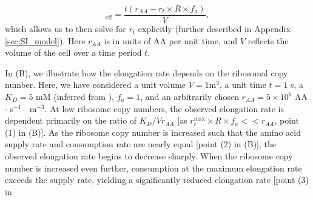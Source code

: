 \begin{equation}
   [AA]_\text{eff} = \frac{t(r_{AA} - r_t \times R \times f_a)}{V},
   \label{eq:aa_final}
\end{equation}
which allows us to then solve for $r_t$ explicitly (further described in
Appendix \ref{sec:SI_model}). Here $r_{AA}$ is in units of AA per unit time, and
$V$ reflects the volume of the cell over a time period $t$.

In (B), we illustrate how the elongation rate depends
on the ribosomal copy number. Here, we have considered a unit volume $V =
1$\textmu m$^3$, a unit time $t = 1$ s, a $K_D = 5$ mM (inferred from
\cite{bennett2009}), $f_a = 1$, and an arbitrarily chosen $r_{AA} = 5\times 10^6$ AA
$\cdot$ s$^{-1} \cdot$ \textmu m$^{-3}$. At low ribosome copy numbers, the
observed elongation rate is dependent primarily on the ratio of $K_D / Vr_{AA}$
[as $r_t^{\text{max}} \times R \times f_a << r_{AA}$, point (1) in
(B)]. As the ribosome copy number is increased such
that the amino acid supply rate and  consumption rate are nearly equal [point
(2) in (B)], the observed elongation rate begins to
decrease sharply. When the ribosome copy number is increased even further,
consumption at the maximum elongation rate exceeds the supply rate, yielding  a
significantly reduced elongation rate [point (3) in
